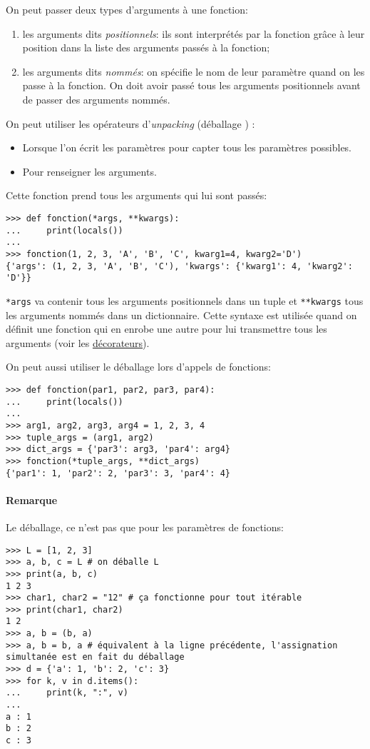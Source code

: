 On peut passer deux types d'arguments à une fonction:
\begin{enumerate}
    \item les arguments dits \emph{positionnels}: ils sont interprétés par la fonction grâce à leur position dans
          la liste des arguments passés à la fonction;
    \item les arguments dits \emph{nommés}: on spécifie le nom de leur paramètre quand on les passe à la fonction.
          On doit avoir passé tous les arguments positionnels avant de passer des arguments nommés.
\end{enumerate}

On peut utiliser les opérateurs d'\emph{unpacking} (\og déballage \fg{}) :
\begin{itemize}
    \item Lorsque l'on écrit les paramètres pour capter tous les paramètres possibles.
    \item Pour renseigner les arguments.
\end{itemize}

Cette fonction prend tous les arguments qui lui sont passés:
\begin{verbatim}
>>> def fonction(*args, **kwargs):
...     print(locals())
...
>>> fonction(1, 2, 3, 'A', 'B', 'C', kwarg1=4, kwarg2='D')
{'args': (1, 2, 3, 'A', 'B', 'C'), 'kwargs': {'kwarg1': 4, 'kwarg2': 'D'}}
\end{verbatim}

\texttt{*args} va contenir tous les arguments positionnels dans un tuple et \texttt{**kwargs}
tous les arguments nommés dans un dictionnaire. Cette syntaxe est utilisée quand on définit une fonction qui en enrobe une
autre pour lui transmettre tous les arguments (voir les \hyperref[sec:decorateur]{décorateurs}).\medskip

On peut aussi utiliser le déballage lors d'appels de fonctions:
\begin{verbatim}
>>> def fonction(par1, par2, par3, par4):
...     print(locals())
...
>>> arg1, arg2, arg3, arg4 = 1, 2, 3, 4
>>> tuple_args = (arg1, arg2)
>>> dict_args = {'par3': arg3, 'par4': arg4}
>>> fonction(*tuple_args, **dict_args)
{'par1': 1, 'par2': 2, 'par3': 3, 'par4': 4}
\end{verbatim}

\paragraph*{Remarque} Le déballage, ce n'est pas que pour les paramètres de fonctions:
\begin{verbatim}
>>> L = [1, 2, 3]
>>> a, b, c = L # on déballe L
>>> print(a, b, c)
1 2 3
>>> char1, char2 = "12" # ça fonctionne pour tout itérable
>>> print(char1, char2)
1 2
>>> a, b = (b, a)
>>> a, b = b, a # équivalent à la ligne précédente, l'assignation simultanée est en fait du déballage
>>> d = {'a': 1, 'b': 2, 'c': 3}
>>> for k, v in d.items():
...     print(k, ":", v)
... 
a : 1
b : 2
c : 3
\end{verbatim}

